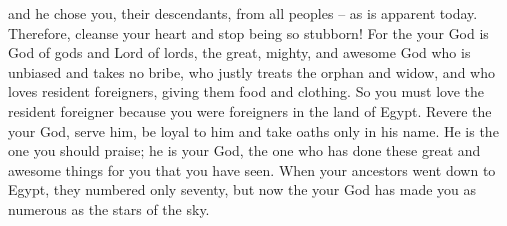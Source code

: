 {and he chose
you, their descendants,
from all
peoples
– as is apparent
today.
Therefore,
cleanse
your heart
and stop being so stubborn!
For
the {}
your God
is
God
of gods
and Lord
of lords,
the great,
mighty,
and awesome
God
who
is unbiased
and takes
no
bribe,
who justly
treats
the orphan
and widow,
and who loves
resident foreigners,
giving
them food
and clothing.
So you must
love
the resident foreigner
because
you were foreigners
in the land
of Egypt.
Revere
the {}
your God,
serve
him, be loyal
to him and take oaths
only in his name.
He is
the one you should praise;
he is
your God,
the one who has
done
these great
and awesome
things
for you that
you have seen.
When your ancestors
went down
to Egypt,
they numbered
only seventy,
but now
the {}
your God
has made you as numerous
as the stars
of the sky.

}
